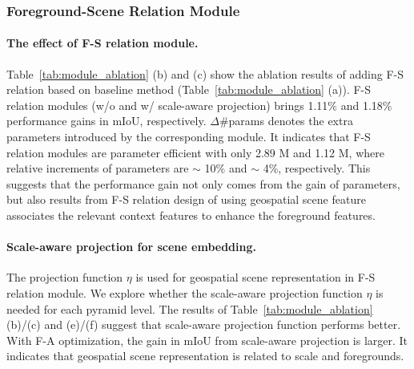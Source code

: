 \documentclass[10pt,twocolumn,letterpaper]{article}
\begin{document}
\subsubsection{Foreground-Scene Relation Module}


\paragraph{The effect of F-S relation module.}
Table~\ref{tab:module_ablation} (b) and (c) show the ablation results of adding F-S relation based on baseline method (Table~\ref{tab:module_ablation} (a)).
F-S relation modules (w/o and w/ scale-aware projection) brings 1.11\% and 1.18\% performance gains in mIoU, respectively.
$\Delta$\#params denotes the extra parameters introduced by the corresponding module.
It indicates that F-S relation modules are parameter efficient with only 2.89 M and 1.12 M, where relative increments of parameters are $\sim$ 10\% and $\sim$ 4\%, respectively.
This suggests that the performance gain not only comes from the gain of parameters, but also results from F-S relation design of using geospatial scene feature associates the relevant context features to enhance the foreground features.


\paragraph{Scale-aware projection for scene embedding.}
The projection function $\eta$ is used for geospatial scene representation in F-S relation module.
We explore whether the scale-aware projection function $\eta$ is needed for each pyramid level.
The results of Table~\ref{tab:module_ablation} (b)/(c) and (e)/(f) suggest that scale-aware projection function performs better.
With F-A optimization, the gain in mIoU from scale-aware projection is larger.
It indicates that geospatial scene representation is related to scale and foregrounds.
\end{document}
